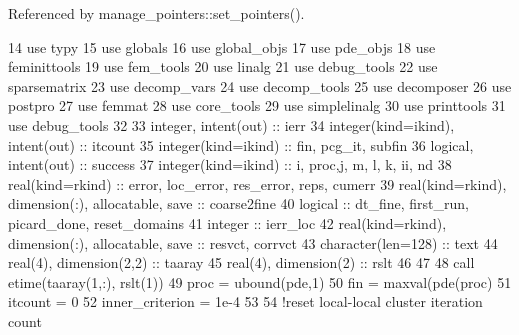 Referenced by manage\+\_\+pointers\+::set\+\_\+pointers().


\begin{DoxyCode}
14         \textcolor{keywordtype}{use }typy
15         \textcolor{keywordtype}{use }globals
16         \textcolor{keywordtype}{use }global_objs
17         \textcolor{keywordtype}{use }pde_objs
18         \textcolor{keywordtype}{use }feminittools
19         \textcolor{keywordtype}{use }fem_tools
20         \textcolor{keywordtype}{use }linalg
21         \textcolor{keywordtype}{use }debug_tools
22         \textcolor{keywordtype}{use }sparsematrix
23         \textcolor{keywordtype}{use }decomp_vars
24         \textcolor{keywordtype}{use }decomp_tools
25         \textcolor{keywordtype}{use }decomposer
26         \textcolor{keywordtype}{use }postpro
27         \textcolor{keywordtype}{use }femmat
28         \textcolor{keywordtype}{use }core_tools
29         \textcolor{keywordtype}{use }simplelinalg
30         \textcolor{keywordtype}{use }printtools
31         \textcolor{keywordtype}{use }debug_tools
32 
33         \textcolor{keywordtype}{integer}, \textcolor{keywordtype}{intent(out)} :: ierr
34         \textcolor{keywordtype}{integer(kind=ikind)}, \textcolor{keywordtype}{intent(out)} :: itcount
35         \textcolor{keywordtype}{integer(kind=ikind)} ::  fin, pcg\_it, subfin
36         \textcolor{keywordtype}{logical}, \textcolor{keywordtype}{intent(out)} :: success
37         \textcolor{keywordtype}{integer(kind=ikind)} :: i, proc,j, m, l, k, ii, nd
38         \textcolor{keywordtype}{real(kind=rkind)} :: error, loc\_error, res\_error, reps, cumerr
39         \textcolor{keywordtype}{real(kind=rkind)}, \textcolor{keywordtype}{dimension(:)}, \textcolor{keywordtype}{allocatable}, \textcolor{keywordtype}{save} :: coarse2fine
40         \textcolor{keywordtype}{logical} :: dt\_fine, first\_run, picard\_done, reset\_domains
41         \textcolor{keywordtype}{integer} :: ierr\_loc
42         \textcolor{keywordtype}{real(kind=rkind)}, \textcolor{keywordtype}{dimension(:)}, \textcolor{keywordtype}{allocatable}, \textcolor{keywordtype}{save} :: resvct, corrvct
43         \textcolor{keywordtype}{character(len=128)} :: text
44         \textcolor{keywordtype}{real(4)}, \textcolor{keywordtype}{dimension(2,2)} :: taaray
45         \textcolor{keywordtype}{real(4)}, \textcolor{keywordtype}{dimension(2)} :: rslt
46 
47 
48         \textcolor{keyword}{call }etime(taaray(1,:), rslt(1))
49         proc = ubound(pde,1)
50         fin = maxval(pde(proc)%
51         itcount = 0
52         inner_criterion = 1e-4
53 
54         \textcolor{comment}{!reset local-local cluster iteration count}

\end{DoxyCode}
